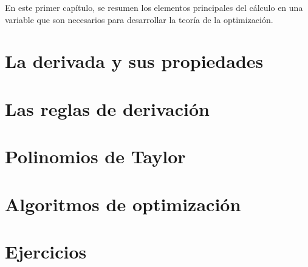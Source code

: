 En este primer capítulo, se resumen los elementos principales del cálculo en una variable que son necesarios para desarrollar la teoría de la optimización. 

\section{La derivada y sus propiedades}

\section{Las reglas de derivación}

\section{Polinomios de Taylor}

\section{Algoritmos de optimización}

\section{Ejercicios}
